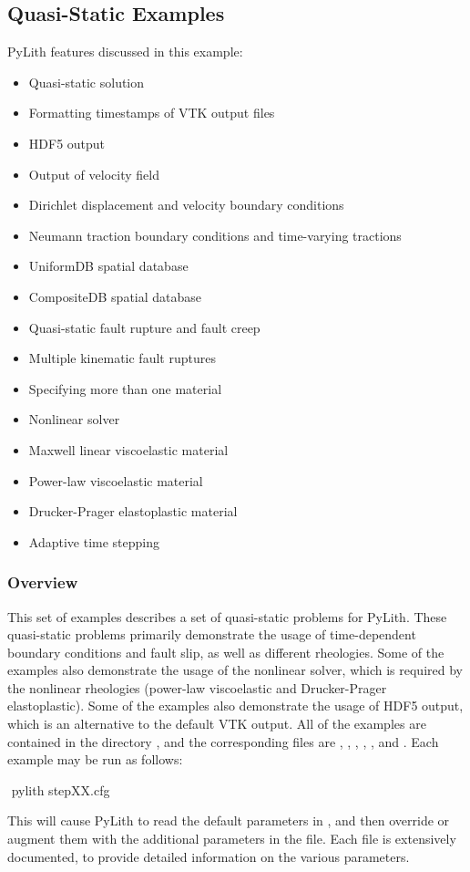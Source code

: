 \subsection{Quasi-Static Examples}
\label{sec:example:3dhex8-quasistatic}

PyLith features discussed in this example:
\begin{itemize}
\item Quasi-static solution
\item Formatting timestamps of VTK output files
\item HDF5 output
\item Output of velocity field
\item Dirichlet displacement and velocity boundary conditions
\item Neumann traction boundary conditions and time-varying tractions
\item UniformDB spatial database
\item CompositeDB spatial database
\item Quasi-static fault rupture and fault creep
\item Multiple kinematic fault ruptures
\item Specifying more than one material
\item Nonlinear solver
\item Maxwell linear viscoelastic material
\item Power-law viscoelastic material
\item Drucker-Prager elastoplastic material
\item Adaptive time stepping
\end{itemize}

\subsubsection{Overview}

This set of examples describes a set of quasi-static problems for
PyLith. These quasi-static problems primarily demonstrate the usage
of time-dependent boundary conditions and fault slip, as well as different
rheologies. Some of the examples also demonstrate the usage of the
nonlinear solver, which is required by the nonlinear rheologies (power-law
viscoelastic and Drucker-Prager elastoplastic). Some of the examples
also demonstrate the usage of HDF5 output, which is an alternative
to the default VTK output. All of the examples are contained in the
directory , and the corresponding 
files are , , ,
, , and .
Each example may be run as follows:
\begin{shell}
$$ pylith stepXX.cfg
\end{shell}
This will cause PyLith to read the default parameters in ,
and then override or augment them with the additional parameters in
the  file. Each  file is extensively
documented, to provide detailed information on the various parameters.


